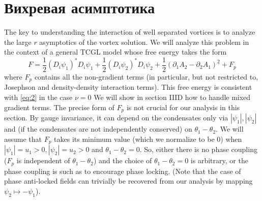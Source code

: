 \chapter{Вихревая асимптотика}
\label{ch:3}

The key to understanding the interaction of well separated vortices is to 
analyze the large \( r \) asymptotics of the vortex solution. We will analyze 
this problem in the context of a general TCGL model whose free energy takes 
the form
\begin{equation}
    F = \frac{1}{2}\left( D_i \psi_1 \right)^{*} D_i \psi_1 + 
        \frac{1}{2}\left( D_i \psi_2 \right)^{*} D_i \psi_2 + 
        \frac{1}{2}\left( \partial_1 A_2 - \partial_2 A_1 \right)^2 + F_p
    \label{eq:3}
\end{equation}
where \( F_p \) contains all the non-gradient terms (in particular, but not 
restricted to, Josephson and density-density interaction terms). This free 
energy is consistent with \eqref{eq:2} in the case \( \nu = 0 \) We will show in 
section IIID how to handle mixed gradient terms. The precise form of \( F_p \) 
is not crucial for our analysis in this section. By gauge invariance, it can 
depend on the condensates only via \( |\psi_1|, |\psi_2| \) and (if the 
condensates are not independently conserved) on \( \theta_1 - \theta_2 \). We 
will assume that \( F_p \) takes its minimum value (which we normalize to be 
0) when \( |\psi_1| = u_1 > 0, |\psi_2| = u_2 > 0 \) and 
\( \theta_1 - \theta_2 = 0 \). So, either there is no phase coupling 
(\( F_p \) is independent of \( \theta_1 - \theta_2 \)) and the choice of 
\( \theta_1 - \theta_2 = 0 \) is arbitrary, or the phase coupling is such as 
to encourage phase locking. (Note that the case of phase anti-locked fields 
can trivially be recovered from our analysis by mapping 
\( \psi_2 \mapsto -\psi_1 \)).

